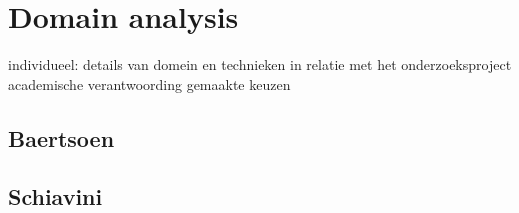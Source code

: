 
\section{Domain analysis}
individueel:  details van domein en technieken in relatie met het onderzoeksproject
academische verantwoording gemaakte keuzen

\subsection{Baertsoen}
\lipsum[1]

\subsection{Schiavini}
\lipsum[1]

